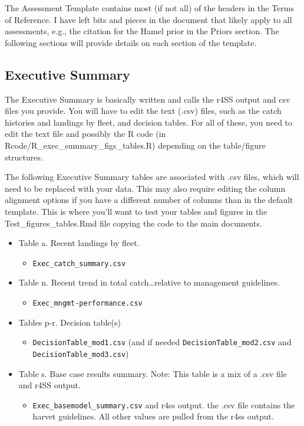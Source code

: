 \documentclass[12pt,]{article}
\providecommand{\tightlist}{%
  \setlength{\itemsep}{0pt}\setlength{\parskip}{0pt}}
\begin{document}
The Assessment Template contains most (if not all) of the headers in the
Terms of Reference. I have left bits and pieces in the document that
likely apply to all assessments, e.g., the citation for the Hamel prior
in the Priors section. The following sections will provide details on
each section of the template.

\subsection{Executive Summary}\label{executive-summary}

The Executive Summary is basically written and calls the r4SS output and
csv files you provide. You will have to edit the text (.csv) files, such
as the catch histories and landings by fleet, and decision tables. For
all of these, you need to edit the text file and possibly the R code (in
Rcode/R\_exec\_summary\_figs\_tables.R) depending on the table/figure
structures.

The following Executive Summary tables are associated with .csv files,
which will need to be replaced with your data. This may also require
editing the column alignment options if you have a different number of
columns than in the default template. This is where you'll want to test
your tables and figures in the Test\_figures\_tables.Rmd file copying
the code to the main documents.

\begin{itemize}
\tightlist
\item
  Table a. Recent landings by fleet.

  \begin{itemize}
  \tightlist
  \item
    \texttt{Exec\_catch\_summary.csv}
  \end{itemize}
\item
  Table n. Recent trend in total catch\ldots{}relative to management
  guidelines.

  \begin{itemize}
  \tightlist
  \item
    \texttt{Exec\_mngmt-performance.csv}
  \end{itemize}
\item
  Tables p-r. Decision table(s)

  \begin{itemize}
  \tightlist
  \item
    \texttt{DecisionTable\_mod1.csv} (and if needed
    \texttt{DecisionTable\_mod2.csv} and
    \texttt{DecisionTable\_mod3.csv})
  \end{itemize}
\item
  Table s. Base case results summary. Note: This table is a mix of a
  .csv file and r4SS output.

  \begin{itemize}
  \tightlist
  \item
    \texttt{Exec\_basemodel\_summary.csv} and r4ss output. the .csv file
    contains the harvet guidelines. All other values are pulled from the
    r4ss output.
  \end{itemize}
\end{itemize}
\end{document}
